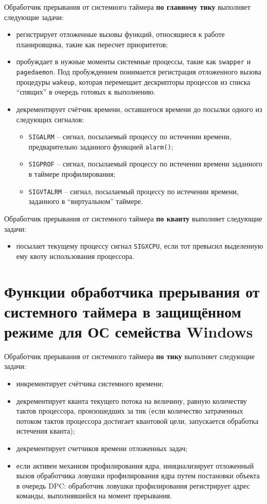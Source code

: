 \documentclass[a4paper,12pt]{bmstu}
\begin{document}
Обработчик прерывания от системного таймера \textbf{по главному тику} выполняет следующие задачи:
\begin{itemize}
    \item регистрирует отложенные вызовы функций, относящиеся к работе планировщика, такие как пересчет приоритетов;
    \item пробуждает в нужные моменты системные процессы, такие как \texttt{swapper} и \texttt{pagedaemon}.
    Под пробуждением понимается регистрация отложенного вызова процедуры \texttt{wakeup}, которая перемещает дескрипторы процессов из списка ``спящих'' в очередь готовых к выполнению.
    \item декрементирует счётчик времени, оставшегося времени до посылки одного из следующих сигналов:
    \begin{itemize}
        \item \texttt{SIGALRM} – сигнал, посылаемый процессу по истечении времени, предварительно заданного функцией \texttt{alarm()};
        \item \texttt{SIGPROF} –  сигнал, посылаемый процессу по истечении времени заданного в таймере профилирования;
        \item \texttt{SIGVTALRM} –  сигнал, посылаемый процессу по истечении времени, заданного в ``виртуальном'' таймере.
    \end{itemize}
\end{itemize}

Обработчик прерывания от системного таймера \textbf{по кванту} выполняет следующие задачи:
\begin{itemize}
    \item посылает текущему процессу сигнал \texttt{SIGXCPU}, если тот превысил выделенную ему квоту использования процессора.
\end{itemize}


\section{Функции обработчика прерывания от системного таймера в защищённом режиме для ОС семейства Windows}

Обработчик прерывания от системного таймера \textbf{по тику} выполняет следующие задачи:
\begin{itemize}
    \item инкрементирует счётчика системного времени;
    \item декрементирует кванта текущего потока на величину, равную количеству тактов процессора, произошедших за тик (если количество затраченных потоком тактов процессора достигает квантовой цели, запускается обработка истечения кванта);
    \item декрементирует счетчиков времени отложенных задач;
    \item если активен механизм профилирования ядра, инициализирует отложенный вызов обработчика ловушки профилирования ядра путем постановки объекта в очередь DPC: обработчик ловушки профилирования регистрирует адрес команды, выполнявшейся на момент прерывания.
\end{itemize}
\end{document}
